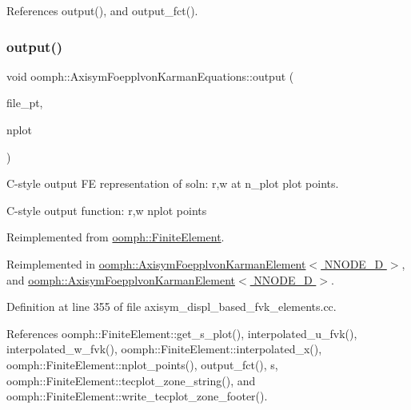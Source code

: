 References output(), and output\+\_\+fct().

\mbox{\label{classoomph_1_1AxisymFoepplvonKarmanEquations_a5278f37c336b7a4bd2931fdedd2945f8}} 
\subsubsection{\texorpdfstring{output()}{output()}\hspace{0.1cm}{\footnotesize\ttfamily [8/8]}}
{\footnotesize\ttfamily void oomph\+::\+Axisym\+Foepplvon\+Karman\+Equations\+::output (\begin{DoxyParamCaption}\item[{F\+I\+LE $\ast$}]{file\+\_\+pt,  }\item[{const unsigned \&}]{nplot }\end{DoxyParamCaption})\hspace{0.3cm}{\ttfamily [virtual]}}



C-\/style output FE representation of soln\+: r,w at n\+\_\+plot plot points. 

C-\/style output function\+: r,w nplot points 

Reimplemented from \hyperlink{classoomph_1_1FiniteElement_adfaee690bb0608f03320eeb9d110d48c}{oomph\+::\+Finite\+Element}.



Reimplemented in \hyperlink{classoomph_1_1AxisymFoepplvonKarmanElement_a09a7d0ec1c8c495c7703e6c034d8eafc}{oomph\+::\+Axisym\+Foepplvon\+Karman\+Element$<$ N\+N\+O\+D\+E\+\_\+D $>$}, and \hyperlink{classoomph_1_1AxisymFoepplvonKarmanElement_a09a7d0ec1c8c495c7703e6c034d8eafc}{oomph\+::\+Axisym\+Foepplvon\+Karman\+Element$<$ N\+N\+O\+D\+E\+\_\+D $>$}.



Definition at line 355 of file axisym\+\_\+displ\+\_\+based\+\_\+fvk\+\_\+elements.\+cc.



References oomph\+::\+Finite\+Element\+::get\+\_\+s\+\_\+plot(), interpolated\+\_\+u\+\_\+fvk(), interpolated\+\_\+w\+\_\+fvk(), oomph\+::\+Finite\+Element\+::interpolated\+\_\+x(), oomph\+::\+Finite\+Element\+::nplot\+\_\+points(), output\+\_\+fct(), s, oomph\+::\+Finite\+Element\+::tecplot\+\_\+zone\+\_\+string(), and oomph\+::\+Finite\+Element\+::write\+\_\+tecplot\+\_\+zone\+\_\+footer().

